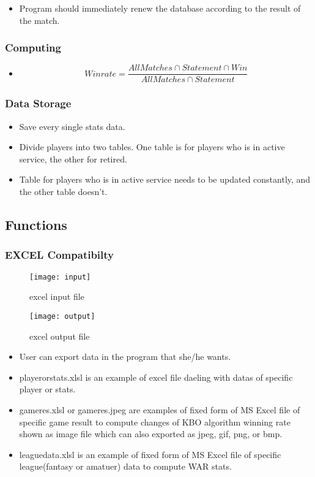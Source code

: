 \documentclass[conference,compsoc, twocolumn]{IEEEtran}
\begin{document}
\begin{itemize}
\item Program should immediately renew the database according to the result of the match.
\end{itemize}


\subsubsection{Computing}
\begin{itemize}
\item \begin{equation} \label{eq:winrate} Winrate = \frac{All Matches\cap Statement\cap Win}{All Matches\cap Statement} \end{equation}
\end{itemize}



\subsubsection{Data Storage}
\begin{itemize}
\item Save every single stats data.
\item Divide players  into two tables. One table is for players who is in active service, the other for retired.
\item Table for players who is in active service needs to be updated constantly, and the other table doesn’t.
\end{itemize}



\subsection{Functions}

\subsubsection{EXCEL Compatibilty}
\begin{figure}[h]
\centering\texttt{[image: input]}
\caption{excel input file}
\end{figure}

\begin{figure}[h]
\centering\texttt{[image: output]}
\caption{excel output file}
\end{figure}


\begin{itemize}
\item User can export data in the program that she/he wants.
\item playerorstats.xlsl is an example of excel file daeling with datas of specific player or stats.
\item gameres.xlsl or gameres.jpeg are examples of fixed form of MS Excel file of specific game result to compute changes of KBO algorithm winning rate shown as image file which can also exported as jpeg, gif, png, or bmp.
\item leaguedata.xlsl is an example of fixed form of MS Excel file of specific league(fantasy or amatuer) data to compute WAR stats.
\end{itemize}
\end{document}
